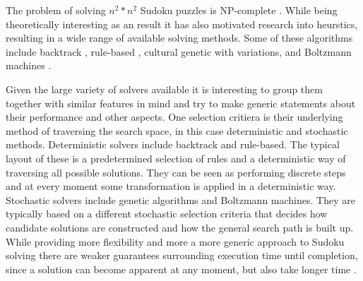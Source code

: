 \documentclass[a4paper,11pt]{kth-mag}
\begin{document}
The problem of solving $n^2 * n^2$ Sudoku puzzles is NP-complete \cite{complexity}.
While being theoretically interesting as an result it has also motivated research into heurstics, resulting in a wide range of available solving methods.
Some of these algorithms include backtrack \cite{searchBased}, rule-based \cite{techniques}, cultural genetic with variations\cite{stochastic}, and Boltzmann machines \cite{boltzmann}.

Given the large variety of solvers available it is interesting to group them together with similar features in mind and try to make generic statements about their performance and other aspects.
One selection critiera is their underlying method of traversing the search space, in this case deterministic and stochastic methods.
Deterministic solvers include backtrack and rule-based.
The typical layout of these is a predetermined selection of rules and a deterministic way of traversing all possible solutions.
They can be seen as performing discrete steps and at every moment some transformation is applied in a deterministic way.
Stochastic solvers include genetic algorithms and Boltzmann machines.
They are typically based on a different stochastic selection criteria that decides how candidate solutions are constructed and how the general search path is built up.
While providing more flexibility and more a more generic approach to Sudoku solving there are weaker guarantees surrounding execution time until completion, since a solution can become apparent at any moment, but also take longer time \cite{stochastic}.

\FloatBarrier
\end{document}
